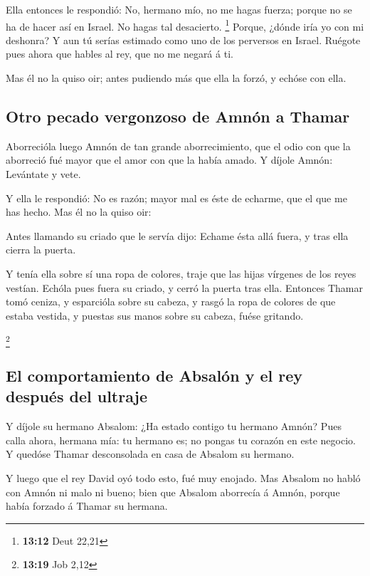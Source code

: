  Ella entonces le respondió: No, hermano mío, no me hagas
fuerza; porque no se ha de hacer así en Israel. No hagas tal desacierto.
\footnote{\textbf{13:12} Deut 22,21}  Porque, ¿dónde iría
yo con mi deshonra? Y aun tú serías estimado como uno de los perversos
en Israel. Ruégote pues ahora que hables al rey, que no me negará á ti.

 Mas él no la quiso oir; antes pudiendo más que ella la
forzó, y echóse con ella.

\hypertarget{otro-pecado-vergonzoso-de-amnuxf3n-a-thamar}{%
\subsection{Otro pecado vergonzoso de Amnón a
Thamar}\label{otro-pecado-vergonzoso-de-amnuxf3n-a-thamar}}

 Aborrecióla luego Amnón de tan grande aborrecimiento, que
el odio con que la aborreció fué mayor que el amor con que la había
amado. Y díjole Amnón: Levántate y vete.

 Y ella le respondió: No es razón; mayor mal es éste de
echarme, que el que me has hecho. Mas él no la quiso oir:

 Antes llamando su criado que le servía dijo: Echame ésta
allá fuera, y tras ella cierra la puerta.

 Y tenía ella sobre sí una ropa de colores, traje que las
hijas vírgenes de los reyes vestían. Echóla pues fuera su criado, y
cerró la puerta tras ella.  Entonces Thamar tomó ceniza, y
esparcióla sobre su cabeza, y rasgó la ropa de colores de que estaba
vestida, y puestas sus manos sobre su cabeza, fuése gritando.

\footnote{\textbf{13:19} Job 2,12}

\hypertarget{el-comportamiento-de-absaluxf3n-y-el-rey-despuuxe9s-del-ultraje}{%
\subsection{El comportamiento de Absalón y el rey después del
ultraje}\label{el-comportamiento-de-absaluxf3n-y-el-rey-despuuxe9s-del-ultraje}}

 Y díjole su hermano Absalom: ¿Ha estado contigo tu hermano
Amnón? Pues calla ahora, hermana mía: tu hermano es; no pongas tu
corazón en este negocio. Y quedóse Thamar desconsolada en casa de
Absalom su hermano.

 Y luego que el rey David oyó todo esto, fué muy enojado.
 Mas Absalom no habló con Amnón ni malo ni bueno; bien que
Absalom aborrecía á Amnón, porque había forzado á Thamar su hermana.


